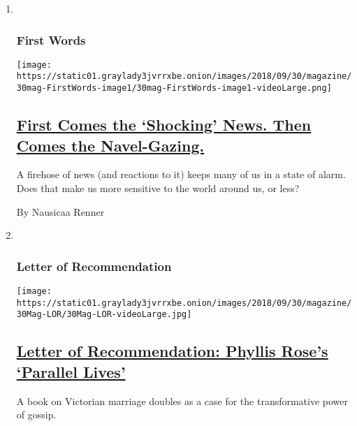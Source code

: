 \begin{enumerate}
\def\labelenumi{\arabic{enumi}.}
\item ~
  \hypertarget{first-words}{%
  \subsubsection{First Words}\label{first-words}}

  \texttt{[image: https://static01.graylady3jvrrxbe.onion/images/2018/09/30/magazine/30mag-FirstWords-image1/30mag-FirstWords-image1-videoLarge.png]}

  \hypertarget{first-comes-the-shocking-news-then-comes-the-navel-gazing}{%
  \subsection{\texorpdfstring{\href{/2018/09/25/magazine/first-comes-the-shocking-news-then-comes-the-navel-gazing.html}{First
  Comes the `Shocking' News. Then Comes the
  Navel-Gazing.}}{First Comes the `Shocking' News. Then Comes the Navel-Gazing.}}\label{first-comes-the-shocking-news-then-comes-the-navel-gazing}}

  A firehose of news (and reactions to it) keeps many of us in a state
  of alarm. Does that make us more sensitive to the world around us, or
  less?

  By Nausicaa Renner
\item ~
  \hypertarget{letter-of-recommendation}{%
  \subsubsection{Letter of
  Recommendation}\label{letter-of-recommendation}}

  \texttt{[image: https://static01.graylady3jvrrxbe.onion/images/2018/09/30/magazine/30Mag-LOR/30Mag-LOR-videoLarge.jpg]}

  \hypertarget{letter-of-recommendation-phyllis-roses-parallel-lives}{%
  \subsection{\texorpdfstring{\href{/2018/09/25/magazine/letter-of-recommendation-phyllis-roses-parallel-lives.html}{Letter
  of Recommendation: Phyllis Rose's `Parallel
  Lives'}}{Letter of Recommendation: Phyllis Rose's `Parallel Lives'}}\label{letter-of-recommendation-phyllis-roses-parallel-lives}}

  A book on Victorian marriage doubles as a case for the transformative
  power of gossip.


\end{enumerate}
